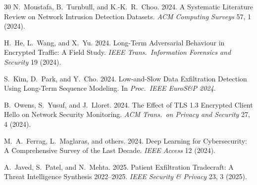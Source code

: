 \documentclass[sigconf,nonacm]{acmart}
\begin{document}
\begin{thebibliography}{30}
N.~Moustafa, B.~Turnbull, and K.-K.~R.~Choo. 2024. A Systematic
Literature Review on Network Intrusion Detection Datasets.
\textit{ACM Computing Surveys} 57, 1 (2024).

H.~He, L.~Wang, and X.~Yu. 2024. Long-Term Adversarial Behaviour in
Encrypted Traffic: A Field Study.
\textit{IEEE Trans.\ Information Forensics and Security} 19 (2024).

S.~Kim, D.~Park, and Y.~Cho. 2024. Low-and-Slow Data Exfiltration
Detection Using Long-Term Sequence Modeling.
In \textit{Proc.\ IEEE EuroS\&P 2024}.

B.~Owens, S.~Yusuf, and J.~Lloret. 2024. The Effect of TLS 1.3
Encrypted Client Hello on Network Security Monitoring.
\textit{ACM Trans.\ on Privacy and Security} 27, 4 (2024).

M.~A.~Ferrag, L.~Maglaras, and others. 2024. Deep Learning for
Cybersecurity: A Comprehensive Survey of the Last Decade.
\textit{IEEE Access} 12 (2024).

A.~Javed, S.~Patel, and N.~Mehta. 2025. Patient Exfiltration
Tradecraft: A Threat Intelligence Synthesis 2022--2025.
\textit{IEEE Security \& Privacy} 23, 3 (2025).

\end{thebibliography}
\end{document}
